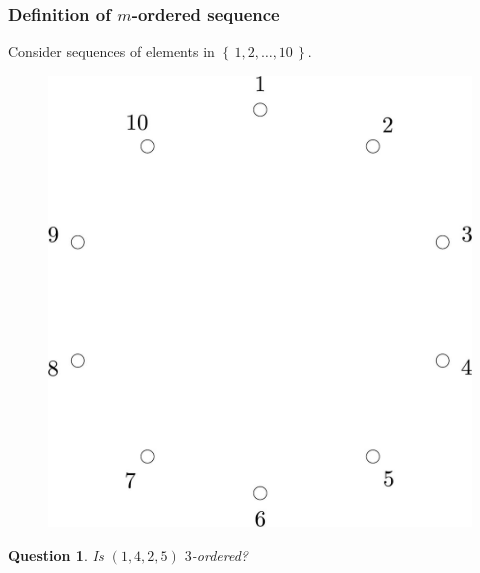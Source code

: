 \documentclass{beamer}
\theoremstyle{plain}
\newtheorem{question}[theorem]{Question}
\theoremstyle{definition}
\theoremstyle{remark}
\renewcommand{\'}{\hspace{0.5mm}'}		%
\renewcommand{\Set}[1]{\left\{\,#1\,\right\}}	%
\begin{document}
\begin{frame}
\frametitle{Definition of $m$-ordered sequence}

	Consider sequences of elements in $\Set{1,2,\hdots, 10}$. 

	\begin{figure}
		\includegraphics[scale=0.1]{circ_10.jpg}
	\end{figure}
	
	\begin{question}
		Is $(1,4,2,5)$ $3$-ordered?
	\end{question}
	
\end{frame}

\end{document}
